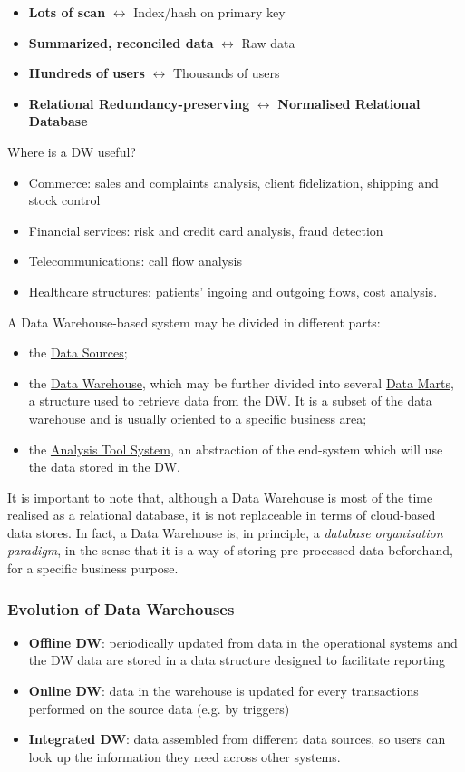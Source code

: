 \documentclass[10pt,a4paper]{article}
\begin{document}
\begin{justify}
\begin{itemize}
	\item \textbf{Lots of scan} $\leftrightarrow$ Index/hash on primary key
	\item \textbf{Summarized, reconciled data} $\leftrightarrow$ Raw data
	\item \textbf{Hundreds of users} $\leftrightarrow$ Thousands of users
	\item \textbf{Relational Redundancy-preserving} $\leftrightarrow$ \textbf{Normalised Relational Database}
\end{itemize}
Where is a DW useful?
\begin{itemize}
	\item Commerce: sales and complaints analysis, client fidelization, shipping and stock control
	\item Financial services: risk and credit card analysis, fraud detection
	\item Telecommunications: call flow analysis
	\item Healthcare structures: patients’ ingoing and outgoing flows, cost analysis.
\end{itemize}
A Data Warehouse-based system may be divided in different parts:
\begin{itemize}
    \item the \uline{Data Sources};
    \item the \uline{Data Warehouse}, which may be further divided into several \uline{Data Marts}, a structure used to retrieve data from the DW. It is a subset of the data warehouse and is usually oriented to a specific business area;
    \item the \uline{Analysis Tool System}, an abstraction of the end-system which will use the data stored in the DW.
\end{itemize}
It is important to note that, although a Data Warehouse is most of the time realised as a relational database, it is not replaceable in terms of cloud-based data stores. In fact, a Data Warehouse is, in principle, a \textit{database organisation paradigm}, in the sense that it is a way of storing pre-processed data beforehand, for a specific business purpose.
\subsubsection{Evolution of Data Warehouses}
\begin{itemize}
	\item \textbf{Offline DW}: periodically updated from data in the operational systems and the DW data are stored in a data structure designed to facilitate reporting
	\item \textbf{Online DW}: data in the warehouse is updated for every transactions performed on the source data (e.g. by triggers)
	\item \textbf{Integrated DW}: data assembled from different data sources, so users can look up the information they need across other systems.
\end{itemize}

\end{justify}
\end{document}
